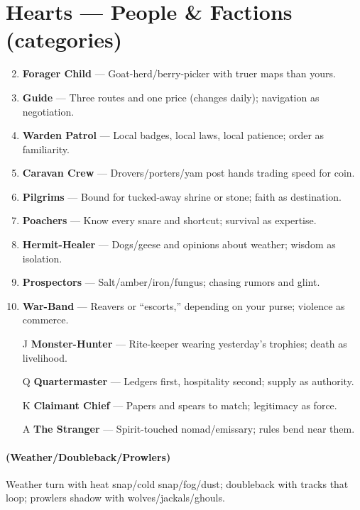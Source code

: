 \section*{Hearts --- People \& Factions (categories)}
\label{sec:wilderness-people}
\begin{enumerate}
\setcounter{enumi}{1}
\item \textbf{Forager Child} --- Goat-herd/berry-picker with truer maps than yours.
\item \textbf{Guide} --- Three routes and one price (changes daily); navigation as negotiation.
\item \textbf{Warden Patrol} --- Local badges, local laws, local patience; order as familiarity.
\item \textbf{Caravan Crew} --- Drovers/porters/yam post hands trading speed for coin.
\item \textbf{Pilgrims} --- Bound for tucked-away shrine or stone; faith as destination.
\item \textbf{Poachers} --- Know every snare and shortcut; survival as expertise.
\item \textbf{Hermit-Healer} --- Dogs/geese and opinions about weather; wisdom as isolation.
\item \textbf{Prospectors} --- Salt/amber/iron/fungus; chasing rumors and glint.
\item \textbf{War-Band} --- Reavers or ``escorts,'' depending on your purse; violence as commerce.
\item[J] \textbf{Monster-Hunter} --- Rite-keeper wearing yesterday's trophies; death as livelihood.
\item[Q] \textbf{Quartermaster} --- Ledgers first, hospitality second; supply as authority.
\item[K] \textbf{Claimant Chief} --- Papers and spears to match; legitimacy as force.
\item[A] \textbf{The Stranger} --- Spirit-touched nomad/emissary; rules bend near them.
\end{enumerate}

\paragraph*{(Weather/Doubleback/Prowlers)} Weather turn with heat snap/cold snap/fog/dust; doubleback with tracks that loop; prowlers shadow with wolves/jackals/ghouls.

